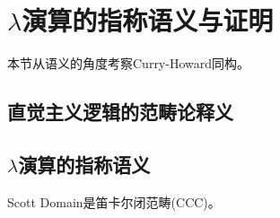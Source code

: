 \section{$\lambda$演算的指称语义与证明}

本节从语义的角度考察Curry-Howard同构。


\subsection{直觉主义逻辑的范畴论释义}




\subsection{$\lambda$演算的指称语义}


Scott Domain是笛卡尔闭范畴(CCC)。 

